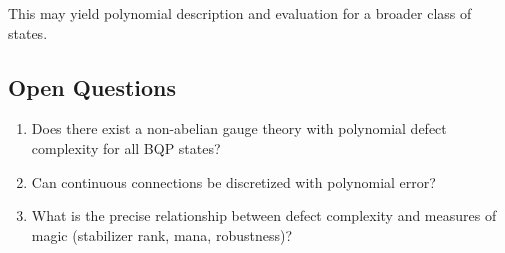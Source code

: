 This may yield polynomial description and evaluation for a broader class of states.

\subsection{Open Questions}

\begin{enumerate}
    \item Does there exist a non-abelian gauge theory with polynomial defect complexity for all BQP states?
    \item Can continuous connections be discretized with polynomial error?
    \item What is the precise relationship between defect complexity and measures of magic (stabilizer rank, mana, robustness)?
\end{enumerate}
